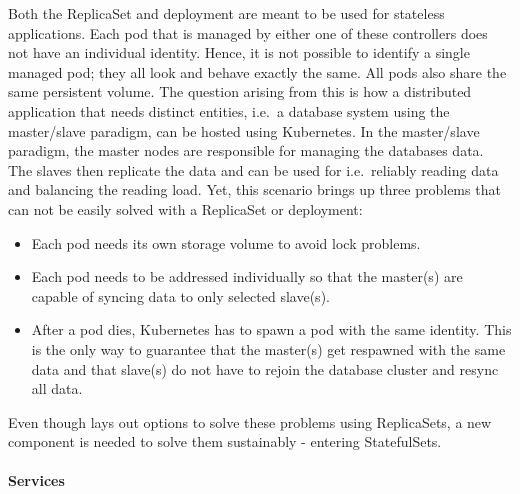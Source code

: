 
Both the ReplicaSet and deployment are meant to be used for stateless
applications. Each pod that is managed by either one of these controllers does
not have an individual identity. Hence, it is not possible to identify a single
managed pod; they all look and behave exactly the same. All pods also share the
same persistent volume. The question arising from this is how a distributed
application that needs distinct entities, i.e.\ a database system using the
master/slave paradigm, can be hosted using Kubernetes. In the master/slave
paradigm, the master nodes are responsible for managing the databases data. The
slaves then replicate the data and can be used for i.e.\ reliably reading data
and balancing the reading load. Yet, this scenario brings up three problems
that can not be easily solved with a ReplicaSet or deployment:

\begin{itemize}
  \item Each pod needs its own storage volume to avoid lock problems.
  \item Each pod needs to be addressed individually so that the master(s) are
    capable of syncing data to only selected slave(s).
  \item After a pod dies, Kubernetes has to spawn a pod with the same identity.
    This is the only way to guarantee that the master(s) get respawned with the
    same data and that slave(s) do not have to rejoin the database cluster and
    resync all data.
\end{itemize}

Even though \autocite[Ch. 10]{LuksaKubernetesAction2017} lays out options to
solve these problems using ReplicaSets, a new component is needed to solve them
sustainably - entering StatefulSets.

\paragraph{Services}%
\label{par:Services}
